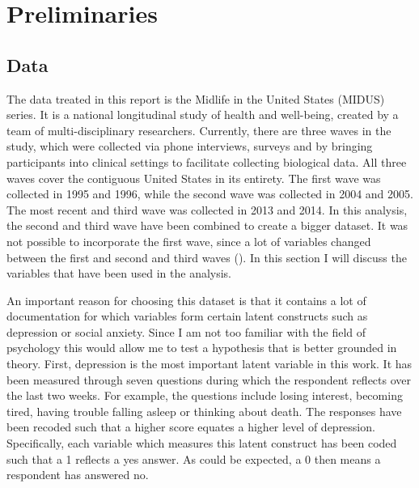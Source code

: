 \documentclass[11pt]{article}
\begin{document}
\section{Preliminaries}
\subsection{Data}

The data treated in this report is the Midlife in the United States (MIDUS)
series. It is a national longitudinal study of health and well-being, created by
a team of multi-disciplinary researchers. Currently, there are three waves in
the study, which were collected via phone interviews, surveys and by bringing
participants into clinical settings to facilitate collecting biological data.
All three waves cover the contiguous United States in its entirety. The first wave
was collected in 1995 and 1996, while the second wave was collected in 2004 and
2005. The most recent and third wave was collected in 2013 and 2014. In this
analysis, the second and third wave have been combined to create a bigger dataset.
It was not possible to incorporate the first wave, since a lot of variables
changed between the first and second and third waves (\cite{radler2014}). In this
section I will discuss the variables that have been used in the analysis.

An important reason for choosing this dataset is that it contains a lot of
documentation for which variables form certain latent constructs such as
depression or social anxiety. Since I am not too familiar with the field of
psychology this would allow me to test a hypothesis that is better grounded in
theory. First, depression is the most important latent variable in this work. It
has been measured through seven questions during which the respondent reflects
over the last two weeks. For example, the questions include losing interest,
becoming tired, having trouble falling asleep or thinking about death. The
responses have been recoded such that a higher score equates a higher level of
depression. Specifically, each variable which measures this latent construct has
been coded such that a 1 reflects a yes answer. As could be expected, a 0 then
means a respondent has answered no.
\end{document}
